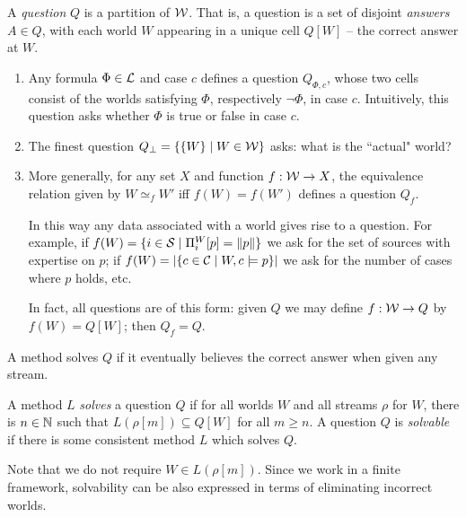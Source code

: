 A \emph{question} $Q$ is a partition of $\mathcal{W}$. That is, a question is a set
of disjoint \emph{answers} $A \in Q$, with each world $W$ appearing in a unique
cell $Q[W]$ -- the correct answer at $W$.

\begin{example}\leavevmode
    \label{ex_questions}
    \begin{enumerate}
        \item Any formula $\Phi \in \mathcal{L}$ and case $c$ defines a question
              $Q_{\Phi, c}$, whose two cells consist of the worlds satisfying
              $\Phi$, respectively $\neg\Phi$, in case $c$. Intuitively, this
              question asks whether $\Phi$ is true or false in case $c$.
        \item The finest question $Q_\bot = \{\{W\} \mid W \in \mathcal{W}\}$ asks:
              what is the ``actual" world?
        \item More generally, for any set $X$ and function $f: \mathcal{W} \to X$,
              the equivalence relation given by $W \simeq_f W'$ iff $f(W) =
              f(W')$ defines a question $Q_f$.

              In this way any data associated with a world gives rise to a
              question. For example, if $f(W) = \{i \in \mathcal{S} \mid \Pi^W_i[p]
              = \|{p}\|\}$ we ask for the set of sources with expertise
              on $p$; if $f(W) = |\{c \in \mathcal{C} \mid W, c \models p\}|$ we
              ask for the number of cases where $p$ holds, etc.

              In fact, all questions are of this form: given $Q$ we may define $f:
              \mathcal{W} \to Q$ by $f(W) = Q[W]$; then $Q_f = Q$.
    \end{enumerate}
\end{example}

A method solves $Q$ if it eventually believes the correct answer when given any
stream.

\begin{definition}
    \label{def_solvability}
    A method $L$ \emph{solves} a question $Q$ if for all worlds $W$ and all
    streams $\rho$ for $W$, there is $n \in \mathbb{N}$ such that $L(\rho[m]) \subseteq
    Q[W]$ for all $m \ge n$. A question $Q$ is \emph{solvable} if there is some
    consistent method $L$ which solves $Q$.
\end{definition}

Note that we do not require $W \in L(\rho[m])$.
%
Since we work in a finite framework, solvability can be also expressed
in terms of eliminating incorrect worlds.

